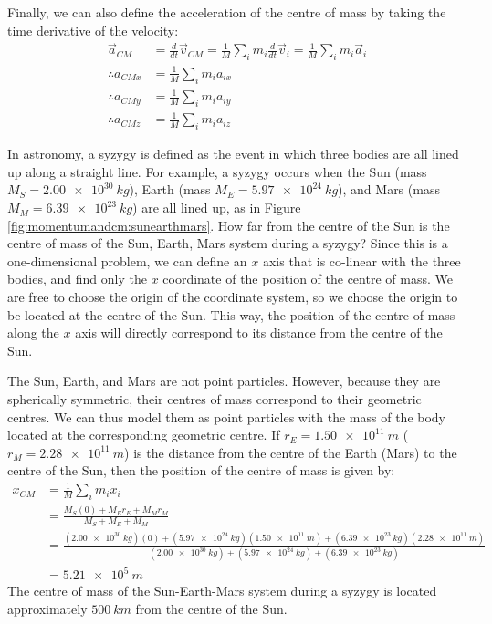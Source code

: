 Finally, we can also define the acceleration of the centre of mass by taking the time derivative of the velocity:
\begin{align}
\vec a_{CM} &= \frac{d}{dt}\vec v_{CM} = \frac{1}{M}\sum_i m_i\frac{d}{dt}\vec v_i=  \frac{1}{M}\sum_i m_i\vec a_i\nonumber\\
\therefore a_{CMx} &= \frac{1}{M}\sum_i m_i a_{ix}\nonumber\\
\therefore a_{CMy} &= \frac{1}{M}\sum_i m_i a_{iy}\nonumber\\
\therefore a_{CMz} &= \frac{1}{M}\sum_i m_i a_{iz}
\end{align}


\begin{example}{
In astronomy, a syzygy is defined as the event in which three bodies are all lined up along a straight line. For example, a syzygy occurs when the Sun (mass $M_S=\SI{2.00e30}{kg}$), Earth (mass $M_E=\SI{5.97e24}{kg}$), and Mars (mass $M_M=\SI{6.39e23}{kg}$) are all lined up, as in Figure \ref{fig:momentumandcm:sunearthmars}. How far from the centre of the Sun is the centre of mass of the Sun, Earth, Mars system during a syzygy?}
Since this is a one-dimensional problem, we can define an $x$ axis that is co-linear with the three bodies, and find only the $x$ coordinate of the position of the centre of mass. We are free to choose the origin of the coordinate system, so we choose the origin to be located at the centre of the Sun. This way, the position of the centre of mass along the $x$ axis will directly correspond to its distance from the centre of the Sun.

The Sun, Earth, and Mars are not point particles. However, because they are spherically symmetric, their centres of mass correspond to their geometric centres. We can thus model them as point particles with the mass of the body located at the corresponding geometric centre. If $r_E=\SI{1.50e11}{m}$ ($r_M=\SI{2.28e11}{m}$) is the distance from the centre of the Earth (Mars) to the centre of the Sun, then the position of the centre of mass is given by:
\begin{align*}
x_{CM} &= \frac{1}{M}\sum_i m_i x_i\\
&=\frac{M_S(0)+M_Er_E+M_Mr_M}{M_S+M_E+M_M}\\
&=\frac{(\SI{2.00e30}{kg})(0)+(\SI{5.97e24}{kg})(\SI{1.50e11}{m})+(\SI{6.39e23}{kg})(\SI{2.28e11}{m})}{(\SI{2.00e30}{kg})+(\SI{5.97e24}{kg})+(\SI{6.39e23}{kg})}\\
&=\SI{5.21e5}{m}
\end{align*}
The centre of mass of the Sun-Earth-Mars system during a syzygy is located approximately $\SI{500}{km}$ from the centre of the Sun.


\end{example}
